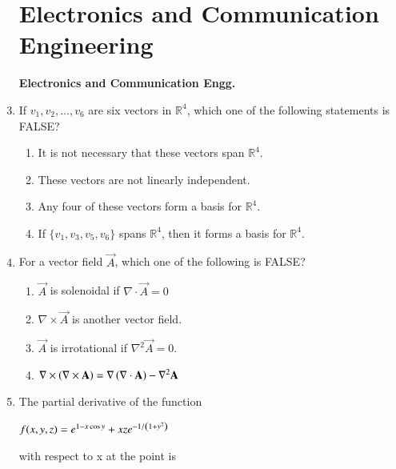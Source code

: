 \documentclass[a4paper, 11pt]{article}
\begin{document}
\begin{enumerate}
\section*{Electronics and Communication Engineering }
    \item[\centerline{\textbf{Electronics and Communication Engg.}}]

    \item If $v_1, v_2, \dots, v_6$ are six vectors in $\mathbb{R}^4$, which one of the following statements is FALSE?
    \begin{enumerate}
        \item It is not necessary that these vectors span $\mathbb{R}^4$.
        \item These vectors are not linearly independent.
        \item Any four of these vectors form a basis for $\mathbb{R}^4$.
        \item If $\{v_1, v_3, v_5, v_6\}$ spans $\mathbb{R}^4$, then it forms a basis for $\mathbb{R}^4$.
    \end{enumerate}

    \hfill{}

    \item For a vector field $\vec{A}$, which one of the following is FALSE?
    \begin{enumerate}
        \item $\vec{A}$ is solenoidal if $\nabla \cdot \vec{A} = 0$
        \item $\nabla \times \vec{A}$ is another vector field.
        \item $\vec{A}$ is irrotational if $\nabla^2 \vec{A} = 0$.
        \item $\nabla \times \left(\nabla \times \mathbf{A}\right) = \nabla\left(\nabla \cdot \mathbf{A}\right) - \nabla^2\mathbf{A}$
    \end{enumerate}

    \hfill{}

    \item The partial derivative of the function
    \begin{center}
    $f(x,y,z) = e^{1-x \cos y} + xze^{-1/\left(1+y^2\right)}$
    \end{center}
    with respect to x at the point  is
    \begin{enumerate}
    \end{enumerate}


\end{enumerate}
\end{document}
